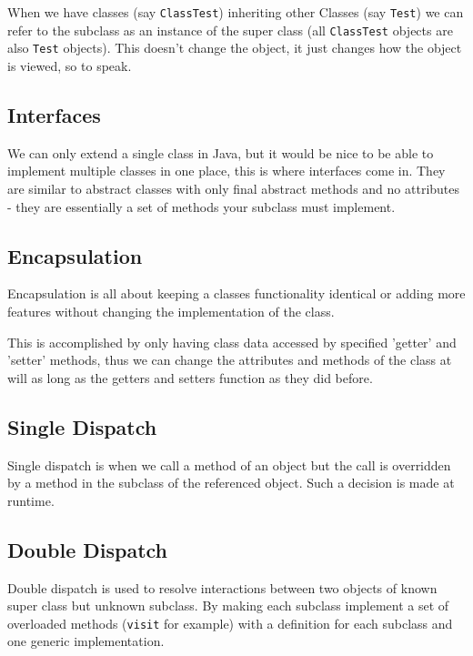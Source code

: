 \documentclass[a4paper, 12pt, twoside]{article}
\begin{document}
When we have classes (say \texttt{ClassTest}) inheriting other Classes
(say \texttt{Test}) we can refer to the subclass as an instance
of the super class (all \texttt{ClassTest} objects are also
\texttt{Test} objects). This doesn't change the object, it just changes
how the object is viewed, so to speak.

\subsection{Interfaces}

We can only extend a single class in Java, but it would be nice to
be able to implement multiple classes in one place, this is where
interfaces come in. They are similar to abstract classes with
only final abstract methods and no attributes - they are essentially
a set of methods your subclass must implement.

\subsection{Encapsulation}

Encapsulation is all about keeping a classes functionality identical
or adding more features without changing the implementation of the
class. 

\vspace{\baselineskip}

This is accomplished by only having class data accessed by
specified 'getter' and 'setter' methods, thus we can change the
attributes and methods of the class at will as long as the
getters and setters function as they did before.

\subsection{Single Dispatch}

Single dispatch is when we call a method of an object but the call is
overridden by a method in the subclass of the referenced object.
Such a decision is made at runtime.

\subsection{Double Dispatch}

Double dispatch is used to resolve interactions between two objects
of known super class but unknown subclass. By making each subclass
implement a set of overloaded methods (\texttt{visit} for example)
with a definition for each subclass and one generic implementation.
\end{document}
